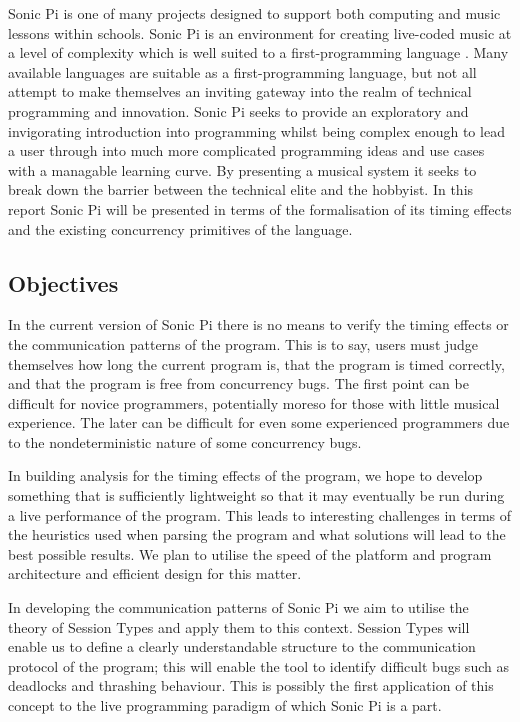 \documentclass[11pt]{scrartcl}
\begin{document}
Sonic Pi is one of many projects designed to support both computing and music 
lessons within schools. Sonic Pi is an environment for creating live-coded 
music at a level of complexity which is well suited to a first-programming 
language \cite{sp}. Many available languages are suitable as a first-programming 
language, but not all attempt to make themselves an inviting gateway into the 
realm of technical programming and innovation. Sonic Pi seeks to provide an 
exploratory and invigorating introduction into programming whilst being complex 
enough to lead a user through into much more complicated programming ideas and 
use cases with a managable learning curve. By presenting a musical system it 
seeks to break down the barrier between the technical elite and the hobbyist. In 
this report Sonic Pi will be presented in terms of the formalisation of its 
timing effects and the existing concurrency primitives of the language. 

\subsection{Objectives}
In the current version of Sonic Pi there is no means to verify the timing effects
or the communication patterns of the program. This is to say, users must judge
themselves how long the current program is, that the program is timed correctly,
and that the program is free from concurrency bugs. The first point can be 
difficult for novice programmers, potentially moreso for those with little 
musical experience. The later can be difficult for even some experienced 
programmers due to the nondeterministic nature of some concurrency bugs.

In building analysis for the timing effects of the program, we hope to develop
something that is sufficiently lightweight so that it may eventually be run
during a live performance of the program. This leads to interesting challenges
in terms of the heuristics used when parsing the program and what solutions will 
lead to the best possible results. We plan to utilise the speed of the platform
and program architecture and efficient design for this matter.

In developing the communication patterns of Sonic Pi we aim to utilise the
theory of Session Types and apply them to this context. Session Types will
enable us to define a clearly understandable structure to the communication
protocol of the program; this will enable the tool to identify difficult bugs
such as deadlocks and thrashing behaviour. This is possibly the first application
of this concept to the live programming paradigm of which Sonic Pi is a part.
\end{document}

